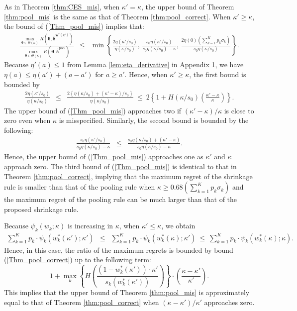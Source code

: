 \documentclass[12pt,a4paper]{article}
\begin{document}
As in Theorem \ref{thm:CES_mis}, when $\kappa' = \kappa$, the upper bound of Theorem \ref{thm:pool_mis} is the same as that of Theorem \ref{thm:pool_correct}. When $\kappa' \geq \kappa$, the bound of (\ref{Thm_pool_mis}) implies that:
\begin{eqnarray*}
\frac{\max_{\bm{\theta} \in \Theta(\kappa)} R(\bm{\theta},\hat{\bm{\delta}}^{\bm{w}^{\ast}(\kappa')})}{\max_{\bm{\theta} \in \Theta(\kappa)} R(\bm{\theta},\hat{\bm{\delta}}^{\mathrm{pool}})} & \leq & \min \left\{ \frac{2 \eta(\kappa' / s_0)}{\eta(\kappa / s_0)}, \, \frac{s_0 \eta(\kappa' / s_0)}{s_0 \eta(\kappa / s_0) - \kappa}, \, \frac{2\eta(0) \left( \sum_{k=1}^K p_k \sigma_k \right)}{s_0 \eta(\kappa / s_0)} \right\}.
\end{eqnarray*}
Because $\eta'(a) \leq 1$ from Lemma \ref{lem:eta_derivative} in Appendix 1, we have $\eta(a) \leq \eta(a') + (a-a')$ for $a \geq a'$. Hence, when $\kappa' \geq \kappa$, the first bound is bounded by
\begin{eqnarray*}
\frac{2 \eta(\kappa' / s_0)}{\eta(\kappa / s_0)} & \leq & \frac{2 \left\{ \eta(\kappa / s_0) + (\kappa' - \kappa)/s_0 \right\} }{\eta(\kappa / s_0)} \ \leq \ 2 \left\{ 1 + H(\kappa / s_0) \left( \frac{\kappa' - \kappa}{\kappa} \right) \right\}.
\end{eqnarray*}
The upper bound of (\ref{Thm_pool_mis}) approaches two if $(\kappa' - \kappa)/\kappa$ is close to zero even when $\kappa$ is misspecified. Similarly, the second bound is bounded by the following:
\begin{eqnarray*}
\frac{s_0 \eta(\kappa' / s_0)}{s_0 \eta(\kappa / s_0) - \kappa} & \leq & \frac{s_0 \eta(\kappa / s_0) + (\kappa' - \kappa)}{s_0 \eta(\kappa / s_0) - \kappa}.
\end{eqnarray*}
Hence, the upper bound of (\ref{Thm_pool_mis}) approaches one as $\kappa'$ and $\kappa$ approach zero. The third bound of (\ref{Thm_pool_mis}) is identical to that in Theorem \ref{thm:pool_correct}, implying that the maximum regret of the shrinkage rule is smaller than that of the pooling rule when $\kappa \geq  0.68 \left( \sum_{k=1}^K p_k \sigma_k \right)$ and the maximum regret of the pooling rule can be much larger than that of the proposed shrinkage rule.

Because $\psi_k(w_k;\kappa)$ is increasing in $\kappa$, when $\kappa' \leq \kappa$, we obtain
\begin{eqnarray*}
\sum_{k=1}^K p_k \cdot \psi_k\left( w_k^{\ast}(\kappa') ;\kappa' \right) & \leq & \sum_{k=1}^K p_k \cdot \psi_k\left( w_k^{\ast}(\kappa) ;\kappa' \right) \ \leq \ \sum_{k=1}^K p_k \cdot \psi_k\left( w_k^{\ast}(\kappa) ;\kappa \right).
\end{eqnarray*}
Hence, in this case, the ratio of the maximum regrets is bounded by bound (\ref{Thm_pool_correct}) up to the following term:
\[
1 + \max_{k} \left\{ H \left( \frac{(1-w_k^{\ast}(\kappa')) \cdot \kappa' }{s_k \left( w_k^{\ast}(\kappa') \right)} \right) \right\} \cdot \left( \frac{\kappa - \kappa'}{\kappa'} \right).
\]
This implies that the upper bound of Theorem \ref{thm:pool_mis} is approximately equal to that of Theorem \ref{thm:pool_correct} when $(\kappa - \kappa')/\kappa'$ approaches zero.
\fi
\end{document}
